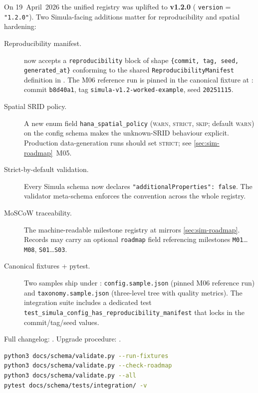 On 19~April~2026 the unified registry was uplifted to \textbf{v1.2.0}
( \texttt{version} = \texttt{"1.2.0"}).
Two Simula-facing additions matter for reproducibility and spatial
hardening:

\begin{description}
  \item[Reproducibility manifest.] 
        now accepts a \texttt{reproducibility} block of shape
        \texttt{\{commit, tag, seed, generated\_at\}} conforming to the
        shared \texttt{ReproducibilityManifest} definition in
        . The M06
        reference run is pinned in the canonical fixture at
        :
        commit \texttt{b8d40a1}, tag
        \texttt{simula-v1.2-worked-example}, seed \texttt{20251115}.
  \item[Spatial SRID policy.] A new enum field
        \texttt{hana\_spatial\_policy} (\textsc{warn}, \textsc{strict},
        \textsc{skip}; default \textsc{warn}) on the config schema
        makes the unknown-SRID behaviour explicit. Production
        data-generation runs should set \textsc{strict}; see
        \cref{sec:sim-roadmap}~M05.
  \item[Strict-by-default validation.] Every Simula schema now declares
        \texttt{"additionalProperties": false}. The validator
        meta-schema enforces the convention across the whole registry.
  \item[MoSCoW traceability.] The machine-readable milestone registry at
         mirrors
        \cref{sec:sim-roadmap}. Records may carry an optional
        \texttt{roadmap} field referencing milestones
        \texttt{M01}\ldots\texttt{M08}, \texttt{S01}\ldots\texttt{S03}.
  \item[Canonical fixtures + pytest.] Two samples ship under
        :
        \texttt{config.sample.json} (pinned M06 reference run) and
        \texttt{taxonomy.sample.json} (three-level tree with quality
        metrics). The integration suite includes a dedicated test
        \texttt{test\_simula\_config\_has\_reproducibility\_manifest}
        that locks in the commit/tag/seed values.
\end{description}

\noindent
Full changelog: .
Upgrade procedure: .

\begin{lstlisting}[language=bash]
python3 docs/schema/validate.py --run-fixtures
python3 docs/schema/validate.py --check-roadmap
python3 docs/schema/validate.py --all
pytest docs/schema/tests/integration/ -v
\end{lstlisting}

\newpage
